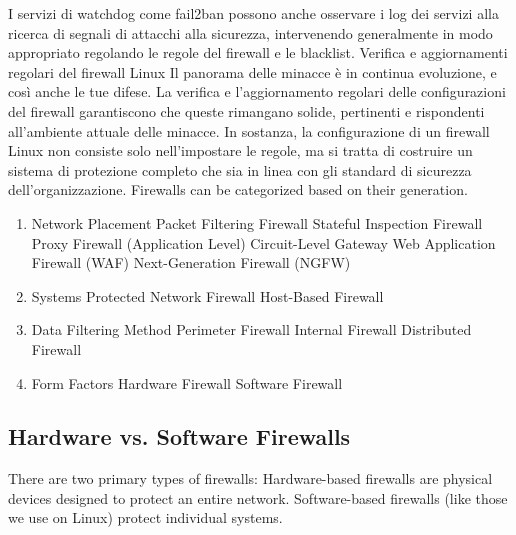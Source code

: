 I servizi di watchdog come fail2ban possono anche osservare i log dei servizi alla ricerca di 
segnali di attacchi alla sicurezza, intervenendo generalmente in modo appropriato regolando le regole 
del firewall e le blacklist.
\vspace{2ex} \newline  
Verifica e aggiornamenti regolari del firewall Linux
Il panorama delle minacce è in continua evoluzione, e così anche le tue difese. 
La verifica e l’aggiornamento regolari delle configurazioni del firewall garantiscono 
che queste rimangano solide, pertinenti e rispondenti all’ambiente attuale delle minacce. 
In sostanza, la configurazione di un firewall Linux non consiste solo nell’impostare le regole, 
ma si tratta di costruire un sistema di protezione completo che sia in linea con gli standard di 
sicurezza dell’organizzazione. 
\vspace{4ex} \newline 
Firewalls can be categorized based on their generation.
\begin{enumerate}
    \item Network Placement
Packet Filtering Firewall
Stateful Inspection Firewall
Proxy Firewall (Application Level)
Circuit-Level Gateway
Web Application Firewall (WAF)
Next-Generation Firewall (NGFW)
\item Systems Protected
Network Firewall
Host-Based Firewall
\item Data Filtering Method
Perimeter Firewall
Internal Firewall
Distributed Firewall
\item Form Factors
Hardware Firewall
Software Firewall 
\end{enumerate} 

\subsection{Hardware vs. Software Firewalls}
There are two primary types of firewalls:
Hardware-based firewalls are physical devices designed to protect an entire network.
Software-based firewalls (like those we use on Linux) protect individual systems.


